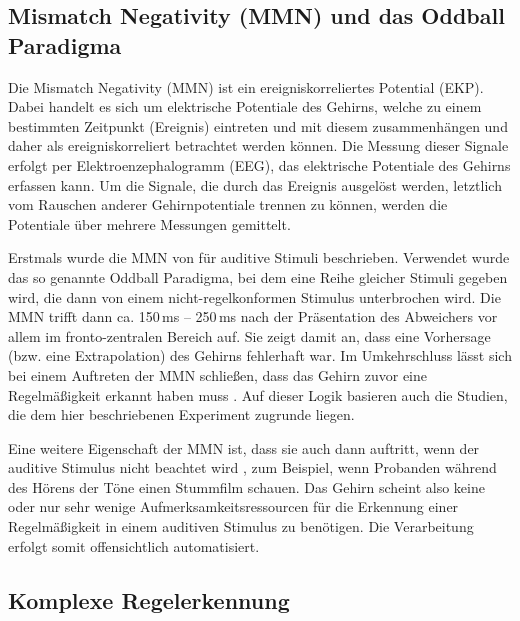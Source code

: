 \documentclass[doc,a4paper,12pt]{apa6}
\begin{document}
\subsection{Mismatch Negativity (MMN) und das Oddball Paradigma}

Die Mismatch Negativity (MMN) ist ein ereigniskorreliertes Potential (EKP). Dabei handelt es sich um elektrische Potentiale des Gehirns, welche zu einem bestimmten Zeitpunkt (Ereignis) eintreten und mit diesem zusammenhängen und daher als ereigniskorreliert betrachtet werden können. Die Messung dieser Signale erfolgt per Elektroenzephalogramm (EEG), das elektrische Potentiale des Gehirns erfassen kann. Um die Signale, die durch das Ereignis ausgelöst werden, letztlich vom Rauschen anderer Gehirnpotentiale trennen zu können, werden die Potentiale über mehrere Messungen gemittelt.

Erstmals wurde die MMN von \textcite{naatanen1978early} für auditive Stimuli beschrieben. Verwendet wurde das so genannte Oddball Paradigma, bei dem eine Reihe gleicher Stimuli gegeben wird, die dann von einem nicht-regelkonformen Stimulus unterbrochen wird. Die MMN trifft dann ca. 150\,ms – 250\,ms nach der Präsentation des Abweichers vor allem im fronto-zentralen Bereich auf. Sie zeigt damit an, dass eine Vorhersage (bzw. eine Extrapolation) des Gehirns fehlerhaft war. Im Umkehrschluss lässt sich bei einem Auftreten der MMN schließen, dass das Gehirn zuvor eine Regelmäßigkeit erkannt haben muss \parencite{schroger2007mismatch}. Auf dieser Logik basieren auch die Studien, die dem hier beschriebenen Experiment zugrunde liegen.

Eine weitere Eigenschaft der MMN ist, dass sie auch dann auftritt, wenn der auditive Stimulus nicht beachtet wird \parencite{naatanen2007mismatch}, zum Beispiel, wenn Probanden während des Hörens der Töne einen Stummfilm schauen. Das Gehirn scheint also keine oder nur sehr wenige Aufmerksamkeitsressourcen für die Erkennung einer Regelmäßigkeit in einem auditiven Stimulus zu benötigen. Die Verarbeitung erfolgt somit offensichtlich automatisiert.

\subsection{Komplexe Regelerkennung}
\end{document}
